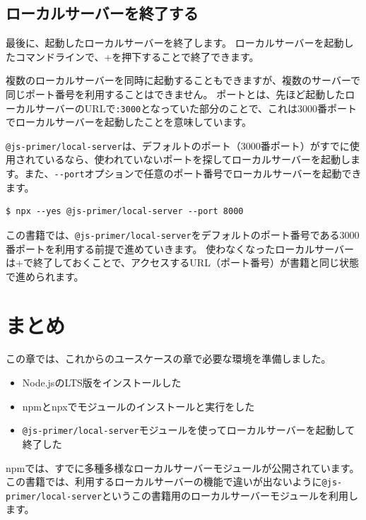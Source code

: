 \hypertarget{close-js-primer-local-server}{%
\subsection{ローカルサーバーを終了する}\label{close-js-primer-local-server}}

最後に、起動したローカルサーバーを終了します。
ローカルサーバーを起動したコマンドラインで、+を押下することで終了できます。

複数のローカルサーバーを同時に起動することもできますが、複数のサーバーで同じポート番号を利用することはできません。
ポートとは、先ほど起動したローカルサーバーのURLで\texttt{:3000}となっていた部分のことで、これは3000番ポートでローカルサーバーを起動したことを意味しています。

\texttt{@js-primer/local-server}は、デフォルトのポート（3000番ポート）がすでに使用されているなら、使われていないポートを探してローカルサーバーを起動します。また、\texttt{-\/-port}オプションで任意のポート番号でローカルサーバーを起動できます。

\begin{lstlisting}
$ npx --yes @js-primer/local-server --port 8000
\end{lstlisting}

この書籍では、\texttt{@js-primer/local-server}をデフォルトのポート番号である3000番ポートを利用する前提で進めていきます。
使わなくなったローカルサーバーは+で終了しておくことで、アクセスするURL（ポート番号）が書籍と同じ状態で進められます。

\hypertarget{conclusion}{%
\section{まとめ}\label{conclusion}}

この章では、これからのユースケースの章で必要な環境を準備しました。

\begin{itemize}
\item
  Node.jsのLTS版をインストールした
\item
  npmとnpxでモジュールのインストールと実行をした
\item
  \texttt{@js-primer/local-server}モジュールを使ってローカルサーバーを起動して終了した
\end{itemize}

npmでは、すでに多種多様なローカルサーバーモジュールが公開されています。
この書籍では、利用するローカルサーバーの機能で違いが出ないように\texttt{@js-primer/local-server}というこの書籍用のローカルサーバーモジュールを利用します。
